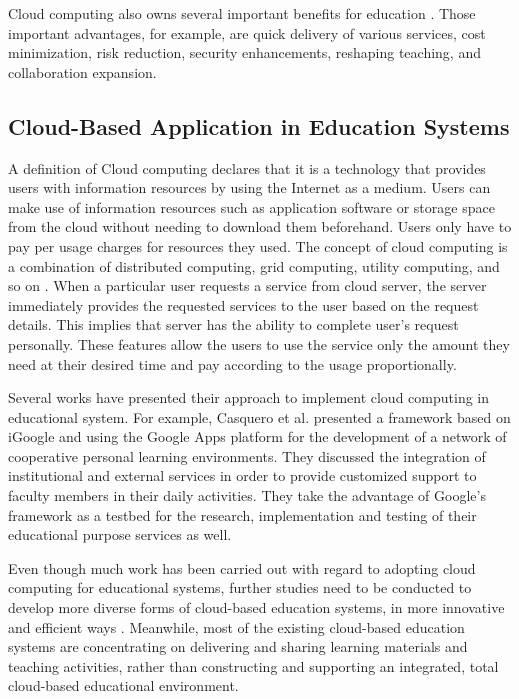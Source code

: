 \documentclass[journal]{vgtc}
\begin{document}
  Cloud computing also owns several important benefits for education \cite{Bouyer2014}. Those important advantages, for example, are quick delivery of various services, cost minimization, risk reduction, security enhancements, reshaping teaching, and collaboration expansion.

  \subsection{Cloud-Based Application in Education Systems}
  A definition of Cloud computing declares that it is a technology that provides users with information resources by using the Internet as a medium. Users can make use of information resources such as application software or storage space from the cloud without needing to download them beforehand. Users only have to pay per usage charges for resources they used. The concept of cloud computing is a combination of distributed computing, grid computing, utility computing, and so on \cite{s110807835}. When a particular user requests a service from cloud server, the server immediately provides the requested services to the user based on the  request details. This implies that server has the ability to complete user's request personally. These features allow the users to use the service only the amount they need at their desired time and pay according to the usage proportionally.
  
  Several works have presented their approach to implement cloud computing in educational system. For example, Casquero et al. \cite{casquero2008igoogle} presented a framework based on iGoogle and using the Google Apps platform for the development of a network of cooperative personal learning environments. They discussed the integration of institutional and external services in order to provide customized support to faculty members in their daily activities. They take the advantage of Google's framework as a testbed for the research, implementation and testing of their educational purpose services as well.

  Even though much work has been carried out with regard to adopting cloud computing for educational systems, further studies need to be conducted to develop more diverse forms of cloud-based education systems, in more innovative and efficient ways \cite{jeong2013content}. Meanwhile, most of the existing cloud-based education systems are concentrating on delivering and sharing learning materials and teaching activities, rather than constructing and supporting an integrated, total cloud-based educational environment.
\end{document}
